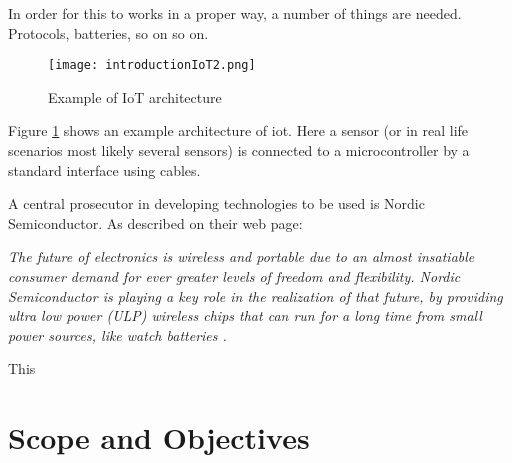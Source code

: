 In order for this to works in a proper way, a number of things are needed. Protocols, batteries, so on so on. 


\begin{figure}[ht]
    \centering
    \texttt{[image: introductionIoT2.png]}    
    \caption{Example of IoT architecture}
    \label{iotExampleArchitecture}
\end{figure}

Figure \ref{iotExampleArchitecture} shows an example architecture of \gls{iot}. Here a sensor (or in real life scenarios most likely several sensors) is connected to a \gls{microcontroller} by a standard interface using cables. 




A central prosecutor in developing technologies to be used is Nordic Semiconductor. As described on their web page: 

\begin{displayquote}
\textit{The future of electronics is wireless and portable due to an almost insatiable consumer demand for ever greater levels of freedom and flexibility. Nordic Semiconductor is playing a key role in the realization of that future, by providing ultra low power (ULP) wireless chips that can run for a long time from small power sources, like watch batteries \cite{aboutNordic}.}
\end{displayquote}

This 





\section{Scope and Objectives}

